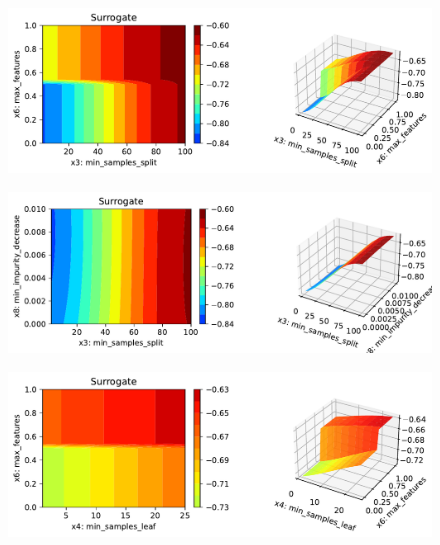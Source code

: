 \documentclass[
  letterpaper,
  DIV=11,
  numbers=noendperiod]{scrreprt}
\begin{document}
\begin{figure}[H]

{\centering \includegraphics{16_spot_hpt_sklearn_multiclass_classification_randomforest_files/figure-pdf/cell-48-output-12.pdf}

}

\end{figure}

\begin{figure}[H]

{\centering \includegraphics{16_spot_hpt_sklearn_multiclass_classification_randomforest_files/figure-pdf/cell-48-output-13.pdf}

}

\end{figure}

\begin{figure}[H]

{\centering \includegraphics{16_spot_hpt_sklearn_multiclass_classification_randomforest_files/figure-pdf/cell-48-output-14.pdf}

}

\end{figure}
\end{document}
